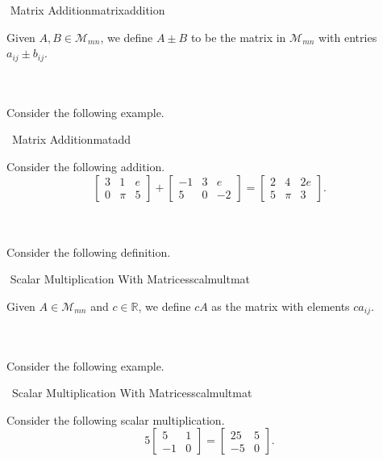         \begin{definition}{\Stop\,\,Matrix Addition}{matrixaddition}
        
            Given \(A,B\in\mathcal{M}_{mn}\), we define \(A\pm B\) to be the matrix in \(\mathcal{M}_{mn}\) with entries \(a_{ij}\pm b_{ij}\).
        
        \end{definition}
        \vphantom
        \\
        \\
        Consider the following example.
        \begin{example}{\Difficulty\,\Difficulty\,\,Matrix Addition}{matadd}
        
            Consider the following addition.
            \begin{equation*}
                \begin{bmatrix} 3 & 1 & e \\ 0 & \pi & 5 \end{bmatrix}+\begin{bmatrix} -1 & 3 & e \\ 5 & 0 & -2 \end{bmatrix}=\begin{bmatrix} 2 & 4 & 2e \\ 5 & \pi & 3 \end{bmatrix}.
            \end{equation*}
        
        \end{example}
        \vphantom
        \\
        \\
        Consider the following definition.
        \begin{definition}{\Stop\,\,Scalar Multiplication With Matrices}{scalmultmat}
        
            Given \(A\in\mathcal{M}_{mn}\) and \(c\in\mathbb{R}\), we define \(cA\) as the matrix with elements \(ca_{ij}\).
        
        \end{definition}
        \vphantom
        \\
        \\
        Consider the following example.
        \begin{example}{\Difficulty\,\Difficulty\,\,Scalar Multiplication With Matrices}{scalmultmat}
        
            Consider the following scalar multiplication.
            \begin{equation*}
                5\begin{bmatrix} 5 & 1 \\ -1 & 0 \end{bmatrix}=\begin{bmatrix} 25 & 5 \\ -5 & 0 \end{bmatrix}.
            \end{equation*}
        
        \end{example}
